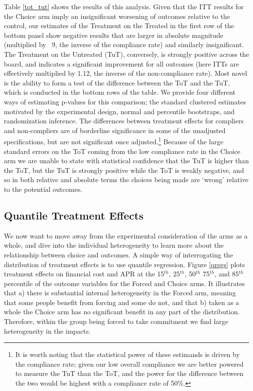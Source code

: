 \documentclass[oneside,11pt]{article}
\begin{document}
Table \ref{tot_tut} shows the results of this analysis.  Given that the ITT results for the Choice arm imply an insignificant worsening of outcomes relative to the control, our estimates of the Treatment on the Treated in the first row of the bottom panel show negative results that are larger in absolute magnitude (multiplied by ~9, the inverse of the compliance rate) and similarly insignificant.  The Treatment on the Untreated (TuT), conversely, is strongly positive across the board, and indicates a significant improvement for all outcomes (here ITTs are effectively multiplied by 1.12, the inverse of the non-compliance rate).  Most novel is the ability to form a test of the difference between the ToT and the TuT, which is conducted in the bottom rows of the table.  We provide four different ways of estimating p-values for this comparison; the standard clustered estimates motivated by the experimental design, normal and percentile bootstraps, and randomization inference.  The differences between treatment effects for compliers and non-compliers are of borderline significance in some of the unadjusted specifications, but are not significant once adjusted.\footnote{It is worth noting that the statistical power of these estimands is driven by the compliance rate; given our low overall compliance we are better powered to measure the TuT than the ToT, and the power for the difference between the two would be highest with a compliance rate of 50\%.}   Because of the large standard errors on the ToT coming from the low compliance rate in the Choice arm we are unable to state with statistical confidence that the TuT is higher than the ToT, but the TuT is strongly positive while the ToT is weakly negative, and so in both relative and absolute terms the choices being made are `wrong' relative to the potential outcomes.






\subsection{Quantile Treatment Effects}


We now want to move away from the experimental consideration of the arms as a whole, and dive into the individual heterogeneity to learn more about the relationship between choice and outcomes.  A simple way of interrogating the distribution of treatment effects is to use quantile regression. Figure \ref{qregs} plots treatment effects on financial cost and APR at the 15$^{th}$, 25$^{th}$, 50$^{th}$ 75$^{th}$, and 85$^{th}$ percentile of the outcome variables for the Forced and Choice arms.  It illustrates that a) there is substantial internal heterogeneity in the Forced arm, meaning that some people benefit from forcing and some do not, and that b) taken as a whole the Choice arm has no significant benefit in any part of the distribution.  Therefore, within the group being forced to take commitment we find large heterogeneity in the impacts.  
\end{document}
